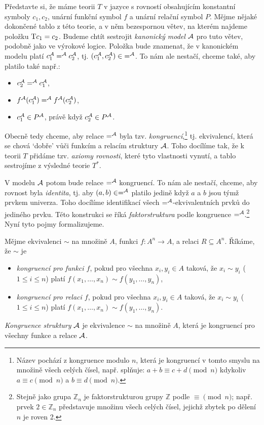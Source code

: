 Představte si, že máme teorii $T$ v jazyce s rovností obsahujícím konstantní symboly $c_1,c_2$, unární funkční symbol $f$ a unární relační symbol $P$. Mějme nějaké dokončené tablo z této teorie, a v něm bezespornou větev, na kterém najdeme položku $\mathrm{T} c_1=c_2$. Budeme chtít sestrojit \emph{kanonický model} $\mathcal{A}$ pro tuto větev, podobně jako ve výrokové logice. Položka bude znamenat, že v kanonickém modelu platí $c_1^{\mathcal{A}} =^{\mathcal{A}} c_2^{\mathcal{A}}$, tj. $(c_1^{\mathcal{A}},c_2^{\mathcal{A}})\in {=^{\mathcal{A}}}$. To nám ale nestačí, chceme také, aby platilo také např.:
\begin{itemize}
    \item $c_2^{\mathcal{A}} =^{\mathcal{A}} c_1^{\mathcal{A}}$,
    \item $f^{\mathcal{A}}(c_1^{\mathcal{A}}) =^{\mathcal{A}} f^{\mathcal{A}}(c_2^{\mathcal{A}})$,
    \item $c_1^{\mathcal{A}}\in P^{\mathcal{A}}$, právě když $c_2^{\mathcal{A}}\in P^{\mathcal{A}}$.
\end{itemize}
Obecně tedy chceme, aby relace $=^{\mathcal{A}}$ byla tzv. \emph{kongruencí},\footnote{Název pochází z kongruence modulo $n$, která je kongruencí v tomto smyslu na množině všech celých čísel, např. splňuje: $a+b\equiv c+d\pmod n$ kdykoliv $a\equiv c\pmod n$ a $b\equiv d\pmod n$.} tj. ekvivalencí, která se chová `dobře' vůči funkcím a relacím struktury $\mathcal{A}$. Toho docílíme tak, že k teorii $T$ přidáme tzv. \emph{axiomy rovnosti}, které tyto vlastnosti vynutí, a tablo sestrojíme z výsledné teorie $T^*$.

V modelu $\mathcal{A}$ potom bude relace $=^{\mathcal{A}}$ kongruencí. To nám ale nestačí, chceme, aby rovnost byla \emph{identita}, tj. aby $(a,b)\in=^{\mathcal{A}}$ platilo jedině když $a$ a $b$ jsou týmž prvkem univerza. Toho docílíme identifikací všech $=^{\mathcal{A}}$-ekvivalentních prvků do jediného prvku. Této konstrukci se říká \emph{faktorstruktura} podle kongruence $=^{\mathcal{A}}$.\footnote{Stejně jako grupa $\mathbb Z_n$ je faktorstrukturou grupy $\mathbb Z$ podle $\equiv\pmod n$; např. prvek $2\in\mathbb Z_n$ představuje množinu všech celých čísel, jejichž zbytek po dělení $n$ je roven 2.} Nyní tyto pojmy formalizujeme.

\begin{definition}[Kongruence]
    Mějme ekvivalenci $\sim$ na množině $A$, funkci $f\colon A^n\to A$, a relaci $R\subseteq A^n$. Říkáme, že $\sim$ je
    \begin{itemize}
        \item \emph{kongruencí pro funkci $f$}, pokud pro všechna $x_i,y_i\in A$ taková, že $x_i\sim y_i$ ($1\leq i\leq n$) platí $f(x_1,\dots,x_n)\sim f(y_1,\dots,y_n)$,
        \item \emph{kongruencí pro relaci $f$}, pokud pro všechna $x_i,y_i\in A$ taková, že $x_i\sim y_i$ ($1\leq i\leq n$) platí $f(x_1,\dots,x_n)\sim f(y_1,\dots,y_n)$.
    \end{itemize}    
    \emph{Kongruence struktury} $\mathcal{A}$ je ekvivalence $\sim$ na množině $A$, která je kongruencí pro všechny funkce a relace $\mathcal{A}$. 
\end{definition}

